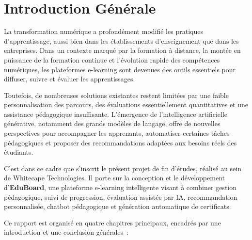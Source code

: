 \chapter*{Introduction Générale}

La transformation numérique a profondément modifié les pratiques d'apprentissage,
aussi bien dans les établissements d'enseignement que dans les entreprises. Dans un
contexte marqué par la formation à distance, la montée en puissance de la formation
continue et l'évolution rapide des compétences numériques, les plateformes e-learning
sont devenues des outils essentiels pour diffuser, suivre et évaluer les apprentissages.
\vspace{1cm}
\medskip


Toutefois, de nombreuses solutions existantes restent limitées par une faible personnalisation
des parcours, des évaluations essentiellement quantitatives et une assistance pédagogique
insuffisante. L'émergence de l'intelligence artificielle générative, notamment des grands
modèles de langage, offre de nouvelles perspectives pour accompagner les apprenants,
automatiser certaines tâches pédagogiques et proposer des recommandations adaptées
aux besoins réels des étudiants.
\vspace{1cm}

\medskip

C'est dans ce cadre que s'inscrit le présent projet de fin d'études, réalisé au sein de
Whitecape Technologies. Il porte sur la conception et le développement d'\textbf{EduBoard},
une plateforme e-learning intelligente visant à combiner gestion pédagogique, suivi
de progression, évaluation assistée par \ac{IA}, recommandation personnalisée, chatbot
pédagogique et génération automatique de certificats.
\vspace{1cm}

\medskip

Ce rapport est organisé en quatre chapitres principaux, encadrés par une introduction
et une conclusion générales~:
\vspace{0.5cm}

